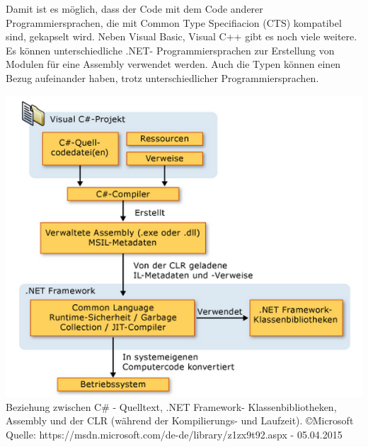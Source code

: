 \documentclass[12pt,a4paper]{report}
\begin{document}
\begin{onehalfspace}
Damit ist es möglich, dass der Code mit dem Code anderer Programmiersprachen, die mit Common Type Specifiacion (CTS) kompatibel sind, gekapselt wird. Neben Visual Basic, Visual C++ gibt es noch viele weitere. Es können unterschiedliche .NET- Programmiersprachen zur Erstellung von Modulen für eine Assembly verwendet werden. Auch die Typen können einen Bezug aufeinander haben, trotz unterschiedlicher Programmiersprachen.
\begin{center}
\includegraphics[scale=0.8]{img/uebersetzung.png}\\
Beziehung zwischen C\# - Quelltext, .NET Framework- Klassenbibliotheken, Assembly und der CLR (während der Kompilierungs- und Laufzeit).
\copyright Microsoft\\
Quelle: https://msdn.microsoft.com/de-de/library/z1zx9t92.aspx - 05.04.2015
\end{center}



\end{onehalfspace}
\end{document}
